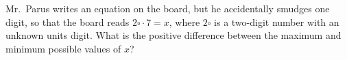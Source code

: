 Mr.~Parus writes an equation on the board, but he accidentally smudges one digit, so that the board reads $2\square\cdot7=x$, where $2\square$ is a two-digit number with an unknown units digit. What is the positive difference between the maximum and minimum possible values of $x$?
